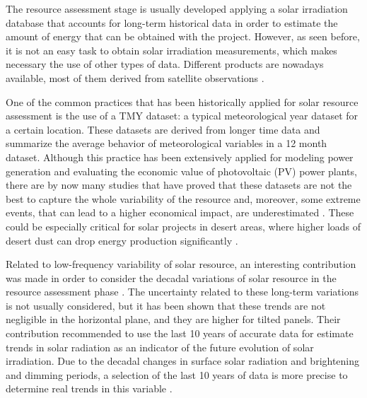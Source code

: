 The resource assessment stage is usually developed applying a solar irradiation database that accounts for long-term historical data in order to estimate the amount of energy that can be obtained with the project. However, as seen before, it is not an easy task to obtain solar irradiation measurements, which makes necessary the use of other types of data. Different products are nowadays available, most of them derived from satellite observations \cite*{nrel}.



One of the common practices that has been historically applied for solar resource assessment is the use of a TMY dataset: a typical meteorological year dataset for a certain location. These datasets are derived from longer time data and summarize the average behavior of meteorological variables in a 12 month dataset. Although this practice has been extensively applied for modeling power generation and evaluating the economic value of photovoltaic (PV) power plants, there are by now many studies that have proved that these datasets are not the best to capture the whole variability of the resource and, moreover, some extreme events, that can lead to a higher economical impact, are underestimated \cite*{Bryce2018, vignola2012b, nrel}. These could be especially critical for solar projects in desert areas, where higher loads of desert dust can drop energy production significantly \cite*{gueymard2014review}.



Related to low-frequency variability of solar resource, an interesting contribution was made in order to consider the decadal variations of solar resource in the resource assessment phase \cite*{muller2014rethinking}. The uncertainty related to these long-term variations is not usually considered, but it has been shown that these trends are not negligible in the horizontal plane, and they are higher for tilted panels. Their contribution recommended to use the last 10 years of accurate data for estimate trends in solar radiation as an indicator of the future evolution of solar irradiation. Due to the decadal changes in surface solar radiation and brightening and dimming periods, a selection of the last 10 years of data is more precise to determine real trends in this variable \cite*{muller2014rethinking}. %

